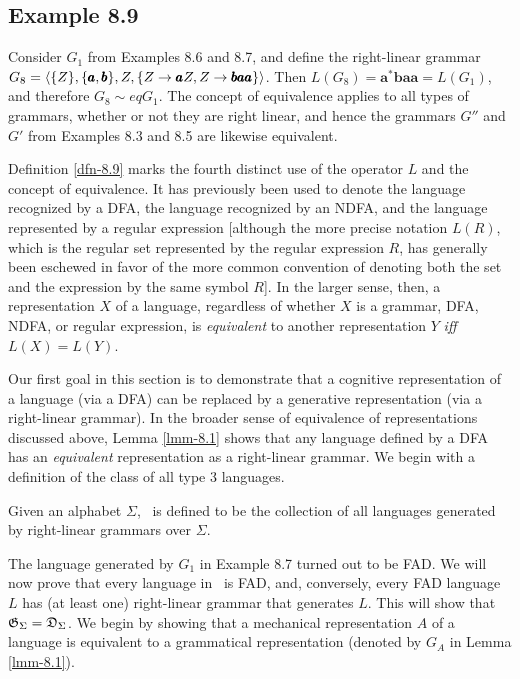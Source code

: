 \subsection*{Example 8.9}

Consider $G_1$ from Examples 8.6 and 8.7, and define the right-linear grammar
$G_8=\langle\{Z\},\{\pmb{a},\pmb{b}\},Z,\linebreak\{Z\rightarrow\pmb{a}Z,Z\rightarrow
\pmb{baa}\}\rangle$. Then $L(G_8)=\pmb{a}^*\pmb{baa}=L(G_1)$, and therefore
$G_8 \sim eq G_1$. The concept of equivalence applies to all types of grammars,
whether or not they are right linear, and hence the grammars $G''$ and $G'$ from
Examples 8.3 and 8.5 are likewise equivalent.

Definition \ref{dfn-8.9} marks the fourth distinct use of the operator $L$ and the concept
of equivalence. It has previously been used to denote the language recognized
by a DFA, the language recognized by an NDFA, and the language represented by a
regular expression [although the more precise notation $L(R)$, which is the
regular set represented by the regular expression $R$, has generally been
eschewed in favor of the more common convention of denoting both the set and the
expression by the same symbol $R$]. In the larger sense, then, a representation
$X$ of a language, regardless of whether $X$ is a grammar, DFA, NDFA, or regular
expression, is \emph{equivalent} to another representation $Y$ \emph{iff} $L(X)=L(Y)$.

Our first goal in this section is to demonstrate that a cognitive representation
of a language (via a DFA) can be replaced by a generative representation (via
a right-linear grammar). In the broader sense of equivalence of representations
discussed above, Lemma \ref{lmm-8.1} shows that any language defined by a DFA has an
\emph{equivalent} representation as a right-linear grammar. We begin with a
definition of the class of all type 3 languages.

\begin{dfn}\label{dfn-8.10}
Given an alphabet $\Sigma$, \GSIG\ is defined to be the collection of
all languages generated by right-linear grammars over $\Sigma$.
\end{dfn}

The language generated by $G_1$ in Example 8.7 turned out to be FAD. We will
now prove that every language in \GSIG\ is FAD, and, conversely, every FAD
language $L$ has (at least one) right-linear grammar that generates $L$. This
will show that $\mathfrak{G}_\Sigma = \mathfrak{D}_\Sigma$. We begin by showing that a mechanical
representation $A$ of a language is equivalent to a grammatical representation
(denoted by $G_A$ in Lemma \ref{lmm-8.1}).

